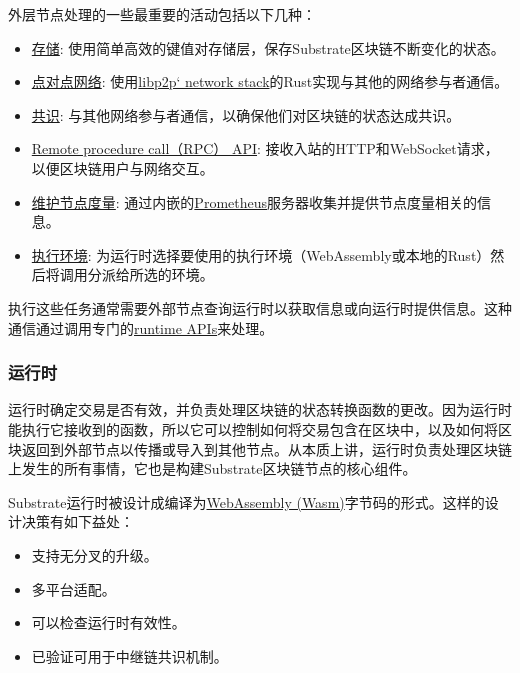 外层节点处理的一些最重要的活动包括以下几种：

\begin{itemize}
\item
  \href{/fundamentals/state-transitions-and-storage/}{存储}:
  使用简单高效的键值对存储层，保存Substrate区块链不断变化的状态。
\item
  \href{/fundamentals/node-and-network-types/}{点对点网络}:
  使用\href{https://libp2p.io/}{libp2p` network
  stack}的Rust实现与其他的网络参与者通信。
\item
  \href{/fundamentals/consensus/}{共识}:
  与其他网络参与者通信，以确保他们对区块链的状态达成共识。
\item
  \href{/build/remote-procedure-calls/}{Remote procedure call（RPC）
  API}: 接收入站的HTTP和WebSocket请求，以便区块链用户与网络交互。
\item
  \href{/maintain/monitor/}{维护节点度量}:
  通过内嵌的\href{https://prometheus.io/}{Prometheus}服务器收集并提供节点度量相关的信息。
\item
  \href{/build/build-process/}{执行环境}:
  为运行时选择要使用的执行环境（WebAssembly或本地的Rust）然后将调用分派给所选的环境。
\end{itemize}

执行这些任务通常需要外部节点查询运行时以获取信息或向运行时提供信息。这种通信通过调用专门的\href{/reference/runtime-apis/}{runtime
APIs}来处理。

\hypertarget{ux8fd0ux884cux65f6}{%
\subsubsection{运行时}\label{ux8fd0ux884cux65f6}}

运行时确定交易是否有效，并负责处理区块链的状态转换函数的更改。因为运行时能执行它接收到的函数，所以它可以控制如何将交易包含在区块中，以及如何将区块返回到外部节点以传播或导入到其他节点。从本质上讲，运行时负责处理区块链上发生的所有事情，它也是构建Substrate区块链节点的核心组件。

Substrate运行时被设计成编译为\href{/reference/glossary\#webassembly-wasm}{WebAssembly
(Wasm)}字节码的形式。这样的设计决策有如下益处：

\begin{itemize}
\item
  支持无分叉的升级。
\item
  多平台适配。
\item
  可以检查运行时有效性。
\item
  已验证可用于中继链共识机制。
\end{itemize}

